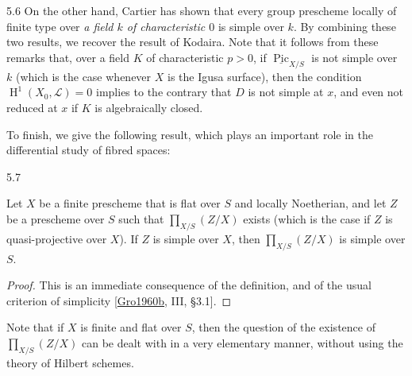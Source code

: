 \begin{remark}{5.6}
    On the other hand, Cartier has shown that every group prescheme locally of finite type over \emph{a field \(k\) of characteristic \(0\)} is simple over \(k\).
    By combining these two results, we recover the result of Kodaira.
    Note that it follows from these remarks that, over a field \(K\) of characteristic \(p>0\), if \(\underline {\operatorname {Pic}}_{X/S}\) is not simple over \(k\) (which is the case whenever \(X\) is the Igusa surface), then the condition \(\operatorname {H}^1(X_0,\mathscr {L})=0\) implies to the contrary that \(D\) is not simple at \(x\), and even not reduced at \(x\) if \(K\) is algebraically closed.\end{remark}\par{}To finish, we give the following result, which plays an important role in the differential study of fibred spaces:\begin{proposition}{5.7}\label{fga3.iv-5-proposition-5.7}\skipsinglepar\par{}Let \(X\) be a finite prescheme that is flat over \(S\) and locally Noetherian, and let \(Z\) be a prescheme over \(S\) such that \(\prod _{X/S}(Z/X)\) exists (which is the case if \(Z\) is quasi-projective over \(X\)).
    If \(Z\) is simple over \(X\), then \(\prod _{X/S}(Z/X)\) is simple over \(S\).\begin{proof}\par{}This is an immediate consequence of the definition, and of the usual criterion of simplicity [\hyperref[Gro1960b]{Gro1960b}, III, §3.1].\end{proof}\end{proposition}\par{}Note that if \(X\) is finite and flat over \(S\), then the question of the existence of \(\prod _{X/S}(Z/X)\) can be dealt with in a very elementary manner, without using the theory of Hilbert schemes.
  

